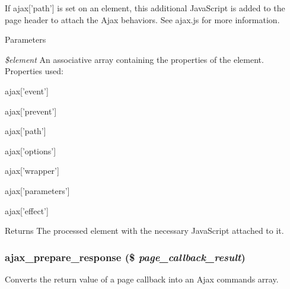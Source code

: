 If ajax\mbox{[}'path'\mbox{]} is set on an element, this additional JavaScript is added to the page header to attach the Ajax behaviors. See ajax.js for more information.


\begin{DoxyParams}{Parameters}
\item[{\em \$element}]An associative array containing the properties of the element. Properties used:
\begin{DoxyItemize}
\item ajax\mbox{[}'event'\mbox{]}
\item ajax\mbox{[}'prevent'\mbox{]}
\item ajax\mbox{[}'path'\mbox{]}
\item ajax\mbox{[}'options'\mbox{]}
\item ajax\mbox{[}'wrapper'\mbox{]}
\item ajax\mbox{[}'parameters'\mbox{]}
\item ajax\mbox{[}'effect'\mbox{]}
\end{DoxyItemize}\end{DoxyParams}
\begin{DoxyReturn}{Returns}
The processed element with the necessary JavaScript attached to it. 
\end{DoxyReturn}
\hypertarget{group__ajax_ga1dc07e6b41b955efdf29c2e7bf0aecdd}{
\subsubsection[{ajax\_\-prepare\_\-response}]{\setlength{\rightskip}{0pt plus 5cm}ajax\_\-prepare\_\-response (\$ {\em page\_\-callback\_\-result})}}
\label{group__ajax_ga1dc07e6b41b955efdf29c2e7bf0aecdd}
Converts the return value of a page callback into an Ajax commands array.


